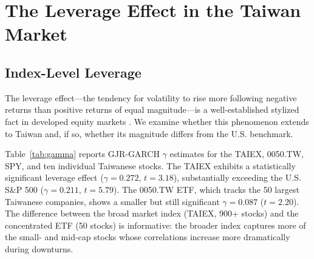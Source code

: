 
\section{The Leverage Effect in the Taiwan Market}
\label{sec:leverage}

\subsection{Index-Level Leverage}

The leverage effect---the tendency for volatility to rise more following negative returns than positive returns of equal magnitude---is a well-established stylized fact in developed equity markets \citep{black1976,christie1982,nelson1991,glosten1993}. We examine whether this phenomenon extends to Taiwan and, if so, whether its magnitude differs from the U.S. benchmark.

Table~\ref{tab:gamma} reports GJR-GARCH $\gamma$ estimates for the TAIEX, 0050.TW, SPY, and ten individual Taiwanese stocks. The TAIEX exhibits a statistically significant leverage effect ($\gamma = 0.272$, $t = 3.18$), substantially exceeding the U.S. S\&P 500 ($\gamma = 0.211$, $t = 5.79$). The 0050.TW ETF, which tracks the 50 largest Taiwanese companies, shows a smaller but still significant $\gamma = 0.087$ ($t = 2.20$). The difference between the broad market index (TAIEX, 900+ stocks) and the concentrated ETF (50 stocks) is informative: the broader index captures more of the small- and mid-cap stocks whose correlations increase more dramatically during downturns.

